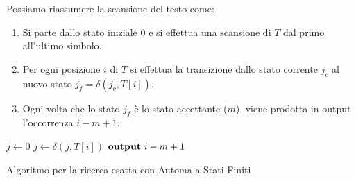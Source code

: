 Possiamo riassumere la scansione del testo come:
\begin{enumerate}
    \item Si parte dallo stato iniziale $0$ e si effettua una scansione di $T$
          dal primo all'ultimo simbolo.
    \item Per ogni posizione $i$ di $T$ si effettua la transizione dallo stato
          corrente $j_c$ al nuovo stato $j_f = \delta(j_c, T[i])$.
    \item Ogni volta che lo stato $j_f$ è lo stato accettante ($m$), viene prodotta
          in output l'occorrenza $i - m + 1$.
\end{enumerate}
\begin{algorithm}
    \begin{algorithmic}
        \State $j \gets 0$
        \State $j \gets \delta(j, T[i])$
        \State $\text{\textbf{output}} \ i - m + 1$
        \EndIf
        \EndFor
        \EndFunction
    \end{algorithmic}
    \caption{Algoritmo per la ricerca esatta con Automa a Stati Finiti}
\end{algorithm}

